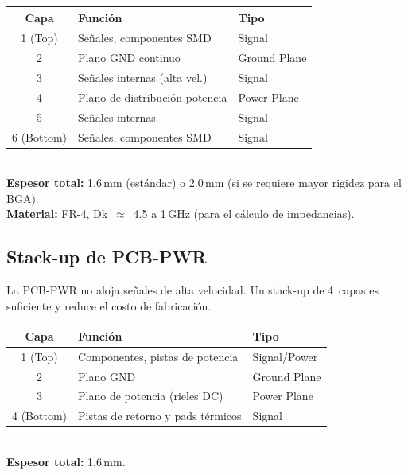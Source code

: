 \begin{fabbox}
  \begin{tabular}{cll}
    \toprule
    \textbf{Capa} & \textbf{Función} & \textbf{Tipo} \\
    \midrule
    1 (Top)    & Señales, componentes SMD       & Signal \\
    2          & Plano GND continuo             & Ground Plane \\
    3          & Señales internas (alta vel.)   & Signal \\
    4          & Plano de distribución potencia & Power Plane \\
    5          & Señales internas               & Signal \\
    6 (Bottom) & Señales, componentes SMD       & Signal \\
    \bottomrule
  \end{tabular}\\[6pt]
  \textbf{Espesor total:} 1.6\,mm (estándar) o 2.0\,mm (si se requiere mayor
  rigidez para el BGA).\\
  \textbf{Material:} FR-4, Dk~$\approx$~4.5 a 1\,GHz (para el cálculo de
  impedancias).
\end{fabbox}

\subsection{Stack-up de PCB-PWR}

La PCB-PWR no aloja señales de alta velocidad. Un stack-up de 4~capas es suficiente
y reduce el costo de fabricación.

\begin{fabbox}
  \begin{tabular}{cll}
    \toprule
    \textbf{Capa} & \textbf{Función} & \textbf{Tipo} \\
    \midrule
    1 (Top)    & Componentes, pistas de potencia    & Signal/Power \\
    2          & Plano GND                          & Ground Plane \\
    3          & Plano de potencia (rieles DC)      & Power Plane \\
    4 (Bottom) & Pistas de retorno y pads térmicos  & Signal \\
    \bottomrule
  \end{tabular}\\[6pt]
  \textbf{Espesor total:} 1.6\,mm.
\end{fabbox}

